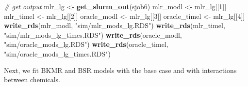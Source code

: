 \documentclass[12pt, twoside]{amherstthesis}
\newenvironment{Shaded}{\begin{snugshade}}{\end{snugshade}}
\newcommand{\CommentTok}[1]{\textcolor[rgb]{0.56,0.35,0.01}{\textit{#1}}}
\newcommand{\DecValTok}[1]{\textcolor[rgb]{0.00,0.00,0.81}{#1}}
\newcommand{\FunctionTok}[1]{\textcolor[rgb]{0.13,0.29,0.53}{\textbf{#1}}}
\newcommand{\NormalTok}[1]{#1}
\newcommand{\OtherTok}[1]{\textcolor[rgb]{0.56,0.35,0.01}{#1}}
\newcommand{\StringTok}[1]{\textcolor[rgb]{0.31,0.60,0.02}{#1}}
\begin{document}
\begin{Shaded}
\begin{Highlighting}[]
\CommentTok{\# get output}
\NormalTok{mlr\_lg }\OtherTok{\textless{}{-}} \FunctionTok{get\_slurm\_out}\NormalTok{(sjob6)}
\NormalTok{mlr\_modl }\OtherTok{\textless{}{-}}\NormalTok{ mlr\_lg[[}\DecValTok{1}\NormalTok{]]}
\NormalTok{mlr\_timel }\OtherTok{\textless{}{-}}\NormalTok{ mlr\_lg[[}\DecValTok{2}\NormalTok{]]}
\NormalTok{oracle\_modl }\OtherTok{\textless{}{-}}\NormalTok{ mlr\_lg[[}\DecValTok{3}\NormalTok{]]}
\NormalTok{oracle\_timel }\OtherTok{\textless{}{-}}\NormalTok{ mlr\_lg[[}\DecValTok{4}\NormalTok{]]}
\FunctionTok{write\_rds}\NormalTok{(mlr\_modl, }\StringTok{"sim/mlr\_mods\_lg.RDS"}\NormalTok{)}
\FunctionTok{write\_rds}\NormalTok{(mlr\_timel, }\StringTok{"sim/mlr\_mods\_lg\_times.RDS"}\NormalTok{)}
\FunctionTok{write\_rds}\NormalTok{(oracle\_modl, }\StringTok{"sim/oracle\_mods\_lg.RDS"}\NormalTok{)}
\FunctionTok{write\_rds}\NormalTok{(oracle\_timel, }\StringTok{"sim/oracle\_mods\_lg\_times.RDS"}\NormalTok{)}
\end{Highlighting}
\end{Shaded}
\normalsize

Next, we fit BKMR and BSR models with the base case and with interactions between chemicals.
\end{document}
